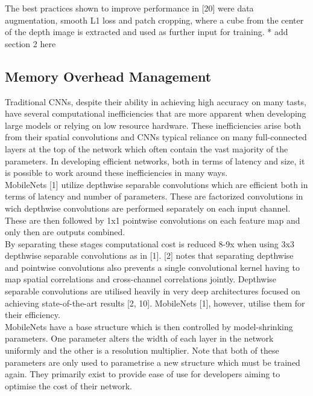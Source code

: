\documentclass{article}
\begin{document}
The best practices shown to improve performance in [20] were data augmentation, smooth L1 loss and patch cropping, where a cube from the center of the depth image is extracted and used as further input for training. * add section 2 here

\subsection*{Memory Overhead Management}
Traditional CNNs, despite their ability in achieving high accuracy on many tasts, have several computational inefficiencies that are more apparent when developing large models or relying on low resource hardware. These inefficiencies  arise both from their spatial convolutions and CNNs typical reliance on many full-connected layers at the top of the network which often contain the vast majority of the parameters. In developing efficient networks, both in terms of latency and size, it is possible to work around these inefficiencies in many ways.\\

MobileNets [1] utilize depthwise separable convolutions which are efficient both in terms of latency  and number of parameters. These are factorized convolutions in wich depthwise convolutions are performed separately on each input channel. These are then followed by 1x1 pointwise convolutions on each feature map and only then are outputs combined.\\ 

By separating these stages computational cost is reduced 8-9x when using 3x3 depthwise separable convolutions as in [1]. [2] notes that separating depthwise and pointwise convolutions also prevents a single convolutional kernel having to map spatial correlations and cross-channel correlations jointly. Depthwise separable convolutions are utilised heavily in very deep architectures focused on achieving state-of-the-art results [2, 10]. MobileNets [1], however, utilise them for their efficiency. \\

MobileNets have a base structure which is then controlled by model-shrinking parameters. One parameter alters the width of each layer in the network uniformly and the other is a resolution multiplier. Note that both of these parameters are only used to parametrise a new structure which must be trained again. They primarily exist to provide ease of use for developers aiming to optimise the cost of their network.\\
\end{document}
